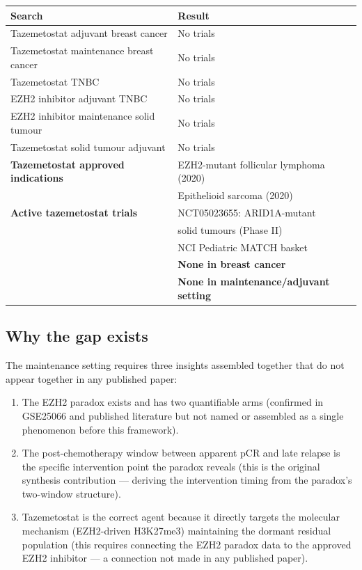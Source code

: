 \documentclass[12pt, a4paper]{article}
\begin{document}
\begin{center}
\begin{tabular}{ll}
\toprule
\textbf{Search} & \textbf{Result} \\
\midrule
Tazemetostat adjuvant breast cancer
& No trials \\
Tazemetostat maintenance breast cancer
& No trials \\
Tazemetostat TNBC
& No trials \\
EZH2 inhibitor adjuvant TNBC
& No trials \\
EZH2 inhibitor maintenance solid tumour
& No trials \\
Tazemetostat solid tumour adjuvant
& No trials \\
\midrule
\textbf{Tazemetostat approved indications}
& EZH2-mutant follicular lymphoma (2020)\\
& Epithelioid sarcoma (2020) \\
\textbf{Active tazemetostat trials}
& NCT05023655: ARID1A-mutant\\
& solid tumours (Phase II)\\
& NCI Pediatric MATCH basket \\
& \textbf{None in breast cancer} \\
& \textbf{None in maintenance/adjuvant setting} \\
\bottomrule
\end{tabular}
\end{center}

\subsection{Why the gap exists}

The maintenance setting requires three insights
assembled together that do not appear together
in any published paper:

\begin{enumerate}
  \item The EZH2 paradox exists and has two
        quantifiable arms (confirmed in GSE25066
        and published literature but not named
        or assembled as a single phenomenon
        before this framework).

  \item The post-chemotherapy window between
        apparent pCR and late relapse is the
        specific intervention point the paradox
        reveals (this is the original synthesis
        contribution --- deriving the intervention
        timing from the paradox's two-window
        structure).

  \item Tazemetostat is the correct agent because
        it directly targets the molecular mechanism
        (EZH2-driven H3K27me3) maintaining the
        dormant residual population (this requires
        connecting the EZH2 paradox data to the
        approved EZH2 inhibitor --- a connection
        not made in any published paper).
\end{enumerate}
\end{document}

